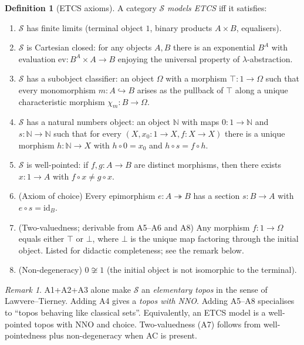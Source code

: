 \documentclass[12pt]{article}
\theoremstyle{definition}
\newtheorem{definition}[theorem]{Definition}
\theoremstyle{remark}
\newtheorem{remark}[theorem]{Remark}
\begin{document}
\begin{definition}[ETCS axioms]
\label{def:etcs}
A category $\mathcal{S}$ \emph{models ETCS} iff it satisfies:
\begin{enumerate}
\item[(A1)] $\mathcal{S}$ has finite limits (terminal object $1$, binary products $A\times B$,
equalisers).
\item[(A2)] $\mathcal{S}$ is Cartesian closed: for any objects $A,B$ there is an
exponential $B^A$ with evaluation $\mathrm{ev}: B^A \times A \to B$ enjoying the universal
property of $\lambda$-abstraction.
\item[(A3)] $\mathcal{S}$ has a subobject classifier: an object $\Omega$ with a morphism
$\top: 1 \to \Omega$ such that every monomorphism $m: A \hookrightarrow B$ arises as the
pullback of $\top$ along a unique characteristic morphism $\chi_m : B \to \Omega$.
\item[(A4)] $\mathcal{S}$ has a natural numbers object: an object $\mathbb{N}$ with maps
$0:1\to \mathbb{N}$ and $s:\mathbb{N}\to \mathbb{N}$ such that for every $(X, x_0:1\to X,
f:X\to X)$ there is a unique morphism $h:\mathbb{N}\to X$ with $h\circ 0 = x_0$ and
$h\circ s = f\circ h$.
\item[(A5)] $\mathcal{S}$ is well-pointed: if $f,g:A\to B$ are distinct morphisms, then
there exists $x:1\to A$ with $f\circ x \ne g\circ x$.
\item[(A6)] (Axiom of choice) Every epimorphism $e: A \twoheadrightarrow B$ has a section
$s: B \to A$ with $e \circ s = \mathrm{id}_B$.
\item[(A7)] (Two-valuedness; derivable from A5--A6 and A8) Any morphism $f:1\to \Omega$
equals either $\top$ or $\bot$, where $\bot$ is the unique map factoring through the
initial object. Listed for didactic completeness; see the remark below.
\item[(A8)] (Non-degeneracy) $0\not\cong 1$ (the initial object is not isomorphic to the
terminal).
\end{enumerate}
\end{definition}

\begin{remark}
A1+A2+A3 alone make $\mathcal{S}$ an \emph{elementary topos} in the sense of
Lawvere--Tierney. Adding A4 gives a \emph{topos with NNO}. Adding A5--A8 specialises to
``topos behaving like classical sets''. Equivalently, an ETCS model is a well-pointed
topos with NNO and choice. Two-valuedness (A7) follows from well-pointedness plus
non-degeneracy when AC is present.
\end{remark}
\end{document}
